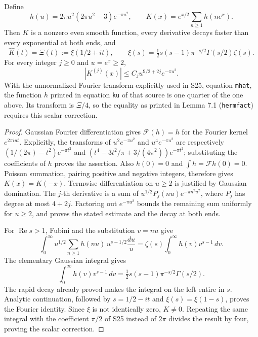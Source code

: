 \begin{lemma}
\label{AC-S04}
Define
\[
 h(u)=2\pi u^2(2\pi u^2-3)e^{-\pi u^2},\qquad
 K(x)=e^{x/2}\sum_{n\geq1}h(ne^x).
\]
Then \(K\) is a nonzero even smooth function, every derivative decays
faster than every exponential at both ends, and
\[
 \widehat K(t)=\Xi(t):=\xi(1/2+it),\qquad
 \xi(s)=\tfrac12s(s-1)\pi^{-s/2}\Gamma(s/2)\zeta(s).
\]
For every integer \(j\geq0\) and \(u=e^x\geq2\),
\[
 |K^{(j)}(x)|\leq C_j u^{9/2+2j}e^{-\pi u^2}.
\]
With the unnormalized Fourier transform explicitly used in S25,
equation \texttt{mhat}, the function \(h\) printed in equation
\texttt{ku} of that source is one quarter of the one above.  Its
transform is \(\Xi/4\), so the equality as printed in Lemma 7.1
(\texttt{hermfact}) requires this scalar correction.
\end{lemma}
\begin{proof}
Gaussian Fourier differentiation gives
\(\mathcal F(h)=h\) for the Fourier kernel \(e^{2\pi iut}\).
Explicitly, the transforms of \(u^2e^{-\pi u^2}\) and
\(u^4e^{-\pi u^2}\) are respectively
\((1/(2\pi)-t^2)e^{-\pi t^2}\) and
\((t^4-3t^2/\pi+3/(4\pi^2))e^{-\pi t^2}\); substituting the
coefficients of \(h\) proves the assertion.  Also \(h(0)=0\) and
\(\int h=\mathcal Fh(0)=0\).  Poisson summation, pairing positive
and negative integers, therefore gives \(K(x)=K(-x)\).
Termwise differentiation on \(u\geq2\) is justified by Gaussian
domination.  The \(j\)-th derivative is a sum of
\(u^{1/2}P_j(nu)e^{-\pi n^2u^2}\), where \(P_j\) has degree at
most \(4+2j\).  Factoring out \(e^{-\pi u^2}\) bounds the remaining
sum uniformly for \(u\geq2\), and proves the stated estimate and
the decay at both ends.

For \(\operatorname{Re}s>1\), Fubini and the substitution \(v=nu\)
give
\[
 \int_0^\infty u^{1/2}\sum_{n\geq1}h(nu)\,
                  u^{s-1/2}\frac{du}{u}
   =\zeta(s)\int_0^\infty h(v)v^{s-1}\,dv.
\]
The elementary Gaussian integral gives
\[
 \int_0^\infty h(v)v^{s-1}\,dv
   =\tfrac12s(s-1)\pi^{-s/2}\Gamma(s/2).
\]
The rapid decay already proved makes the integral on the left entire
in \(s\).  Analytic continuation, followed by \(s=1/2-it\) and
\(\xi(s)=\xi(1-s)\), proves the Fourier identity.  Since \(\xi\)
is not identically zero, \(K\ne0\).  Repeating the same integral
with the coefficient \(\pi/2\) of S25 instead of \(2\pi\) divides
the result by four, proving the scalar correction.
\end{proof}

